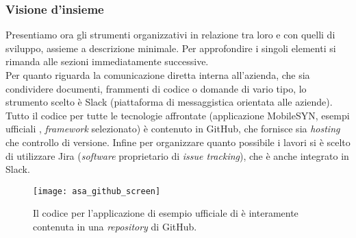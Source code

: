\subsubsection{Visione d'insieme}
Presentiamo ora gli strumenti organizzativi in relazione tra loro e con quelli di sviluppo, assieme a descrizione minimale. Per approfondire i singoli elementi si rimanda alle sezioni immediatamente successive.\\
Per quanto riguarda la comunicazione diretta interna all'azienda, che sia condividere documenti, frammenti di codice o domande di vario tipo, lo strumento scelto è Slack (piattaforma di messaggistica orientata alle aziende).\\
Tutto il codice per tutte le tecnologie affrontate (applicazione MobileSYN, esempi ufficiali \asa{}, \textit{framework} selezionato) è contenuto in GitHub, che fornisce sia \textit{hosting} che controllo di versione. Infine per organizzare quanto possibile i lavori si è scelto di utilizzare Jira (\textit{software} proprietario di \textit{issue tracking}), che è anche integrato in Slack.\\
\begin{figure}[H]
    \centering
    \texttt{[image: asa\_github\_screen]}
    \caption[\textit{Repository} per esempio \asa{}]{Il codice per l'applicazione di esempio ufficiale di \asa{} è interamente contenuta in una \textit{repository} di GitHub.\footnotemark}
\end{figure}

